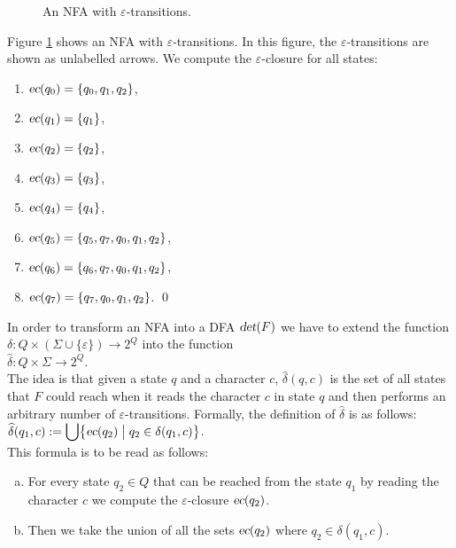 \begin{figure}[!ht]
  \centering

   \caption{An \textsc{NFA} with $\varepsilon$-transitions.}
  \label{fig:ab-or-ba-star.dot}
\end{figure}

\exampleEng
Figure \ref{fig:ab-or-ba-star.dot} shows an \textsc{NFA} with 
$\varepsilon$-transitions.   In this figure, the $\varepsilon$-transitions are shown as unlabelled arrows.
We compute the $\varepsilon$-closure for all states:
\begin{enumerate}
\item $\textsl{ec}(q_0) = \{ q_0, q_1, q_2 \}$,
\item $\textsl{ec}(q_1) = \{ q_1 \}$,
\item $\textsl{ec}(q_2) = \{ q_2 \}$,
\item $\textsl{ec}(q_3) = \{ q_3 \}$,
\item $\textsl{ec}(q_4) = \{ q_4 \}$,
\item $\textsl{ec}(q_5) = \{ q_5, q_7, q_0, q_1, q_2 \}$,
\item $\textsl{ec}(q_6) = \{ q_6, q_7, q_0, q_1, q_2 \}$,
\item $\textsl{ec}(q_7) = \{ q_7, q_0, q_1, q_2 \}$.
      \qed
\end{enumerate}

\noindent
In order to transform an \textsc{NFA} into a  \textsc{DFA}
$\textsl{det}(F)$ we have to extend the function $\delta:Q  \times (\Sigma \cup \{\varepsilon\}) \rightarrow 2^Q$ into the function
\\[0.2cm]
\hspace*{1.3cm}
$\widehat{\delta}: Q \times \Sigma \rightarrow 2^Q$.
\\[0.2cm]
The idea is that given a state $q$ and a character $c$,  $\widehat{\delta}(q,c)$ is the set of all states that 
$F$ could reach when it reads the character $c$ in state $q$ and then performs an arbitrary number
of $\varepsilon$-transitions.  Formally, the definition of $\widehat{\delta}$ is as follows:
\\[0.2cm]
\hspace*{1.3cm}
$\displaystyle \widehat{\delta}(q_1, c) := \bigcup \bigl\{ \textsl{ec}(q_2) \bigm| q_2 \in \delta(q_1, c) \bigr \}$.
\\[0.2cm]
This formula is to be read as follows:
\begin{enumerate}[(a)]
\item For every state $q_2 \in Q$ that can be reached from the state $q_1$ by reading the character $c$ we
      compute the $\varepsilon$-closure $\textsl{ec}(q_2)$.
\item Then we take the union of all the sets $\textsl{ec}(q_2)$ where $q_2 \in \delta(q_1, c)$.
\end{enumerate}


